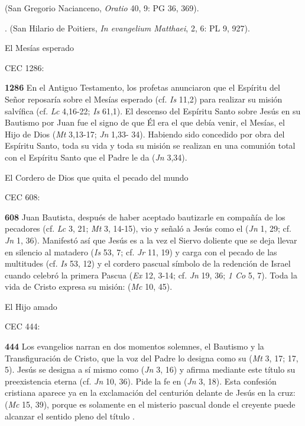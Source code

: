 \begin{body}
\begin{body}
{ (San Gregorio Nacianceno, \emph{Oratio} 40, 9: PG 36, 369).

. (San Hilario de Poitiers, \emph{In evangelium Matthaei}, 2, 6: PL 9, 927).

El Mesías esperado

CEC 1286:

\textbf{1286} En el Antiguo Testamento, los profetas anunciaron que el Espíritu del Señor reposaría sobre el Mesías esperado (cf. \emph{Is} 11,2) para realizar su misión salvífica (cf. \emph{Lc} 4,16-22; \emph{Is} 61,1). El descenso del Espíritu Santo sobre Jesús en su Bautismo por Juan fue el signo de que Él era el que debía venir, el Mesías, el Hijo de Dios (\emph{Mt} 3,13-17; \emph{Jn} 1,33- 34). Habiendo sido concedido por obra del Espíritu Santo, toda su vida y toda su misión se realizan en una comunión total con el Espíritu Santo que el Padre le da  (\emph{Jn} 3,34).

El Cordero de Dios que quita el pecado del mundo

CEC 608:

\textbf{608} Juan Bautista, después de haber aceptado bautizarle en compañía de los pecadores (cf. \emph{Lc} 3, 21; \emph{Mt} 3, 14-15), vio y señaló a Jesús como el  (\emph{Jn} 1, 29; cf. \emph{Jn} 1, 36). Manifestó así que Jesús es a la vez el Siervo doliente que se deja llevar en silencio al matadero (\emph{Is} 53, 7; cf. \emph{Jr} 11, 19) y carga con el pecado de las multitudes (cf. \emph{Is} 53, 12) y el cordero pascual símbolo de la redención de Israel cuando celebró la primera Pascua (\emph{Ex} 12, 3-14; cf. \emph{Jn} 19, 36; \emph{1 Co} 5, 7). Toda la vida de Cristo expresa su misión:  (\emph{Mc} 10, 45).

El Hijo amado

CEC 444:

\textbf{444} Los evangelios narran en dos momentos solemnes, el Bautismo y la Transfiguración de Cristo, que la voz del Padre lo designa como su  (\emph{Mt} 3, 17; 17, 5). Jesús se designa a sí mismo como  (\emph{Jn} 3, 16) y afirma mediante este título su preexistencia eterna (cf. \emph{Jn} 10, 36). Pide la fe en  (\emph{Jn} 3, 18). Esta confesión cristiana aparece ya en la exclamación del centurión delante de Jesús en la cruz:  (\emph{Mc} 15, 39), porque es solamente en el misterio pascual donde el creyente puede alcanzar el sentido pleno del título .

}
\end{body}
\end{body}
